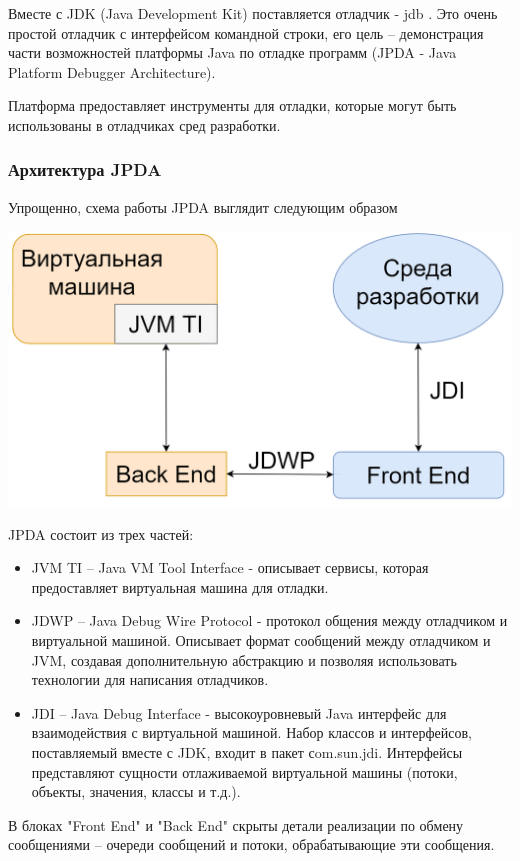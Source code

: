 Вместе с JDK (Java Development Kit) поставляется отладчик - jdb \cite{debug:jdb}. Это очень простой отладчик с интерфейсом командной строки, его цель -- демонстрация части возможностей платформы Java по отладке программ (JPDA - Java Platform Debugger Architecture). 

Платформа предоставляет инструменты для отладки, которые могут быть использованы в отладчиках сред разработки.

\subsubsection{Архитектура JPDA}
Упрощенно, схема работы JPDA выглядит следующим образом

\vspace{1em}
\includegraphics[scale=0.4]{chapter1/img/jdpa.png}

JPDA состоит из трех частей:
\begin{itemize}
	\item JVM TI -- Java VM Tool Interface - описывает сервисы, которая предоставляет виртуальная машина для отладки. 
	\item JDWP -- Java Debug Wire Protocol - протокол общения между отладчиком и виртуальной машиной. Описывает формат сообщений между отладчиком и JVM, создавая дополнительную абстракцию и позволяя использовать технологии для написания отладчиков.
	\item JDI -- Java Debug Interface - высокоуровневый Java интерфейс для взаимодействия с виртуальной машиной. Набор классов и интерфейсов, поставляемый вместе с JDK, входит в пакет сom.sun.jdi. Интерфейсы представляют сущности отлаживаемой виртуальной машины (потоки, объекты, значения, классы и т.д.).
\end{itemize}

В блоках "Front End" и "Back End" скрыты детали реализации по обмену сообщениями -- очереди сообщений и потоки, обрабатывающие эти сообщения.


